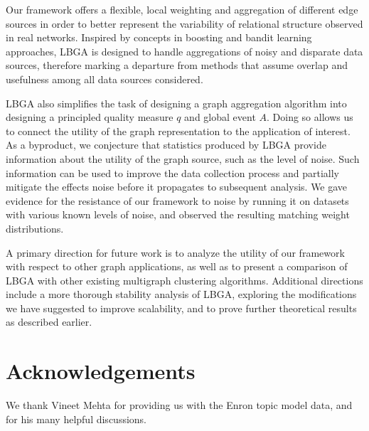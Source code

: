 \documentclass{IEEEtran}
\begin{document}
Our framework offers a flexible, local weighting and aggregation of different
edge sources in order to better represent the variability of relational
structure observed in real networks. Inspired by concepts in boosting and
bandit learning approaches, LBGA is designed to handle aggregations of noisy
and disparate data sources, therefore marking a departure from methods that
assume overlap and usefulness among all data sources considered. 

LBGA also simplifies the task of designing a graph aggregation algorithm into
designing a principled quality measure $q$ and global event $A$. Doing so
allows us to connect the utility of the graph representation to the application
of interest. As a byproduct, we conjecture that statistics produced by LBGA
provide information about the utility of the graph source, such as the level of
noise. Such information can be used to improve the data collection process and
partially mitigate the effects noise before it propagates to subsequent
analysis. We gave evidence for the resistance of our framework to noise by
running it on datasets with various known levels of noise, and observed the
resulting matching weight distributions. 

A primary direction for future work is to analyze the utility of our
framework with respect to other graph applications, as well as to present a
comparison of LBGA with other existing multigraph clustering
algorithms. 
Additional directions include a more thorough stability analysis of LBGA,
exploring the modifications we have suggested to improve scalability, and to
prove further theoretical results as described earlier.

\section{Acknowledgements} We thank Vineet Mehta for providing us with the
Enron topic model data, and for his many helpful discussions.



\end{document}
